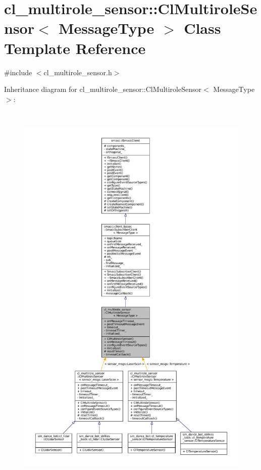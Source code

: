 \hypertarget{classcl__multirole__sensor_1_1ClMultiroleSensor}{}\section{cl\+\_\+multirole\+\_\+sensor\+:\+:Cl\+Multirole\+Sensor$<$ Message\+Type $>$ Class Template Reference}
\label{classcl__multirole__sensor_1_1ClMultiroleSensor}


{\ttfamily \#include $<$cl\+\_\+multirole\+\_\+sensor.\+h$>$}



Inheritance diagram for cl\+\_\+multirole\+\_\+sensor\+:\+:Cl\+Multirole\+Sensor$<$ Message\+Type $>$\+:
\nopagebreak
\begin{figure}[H]
\begin{center}
\leavevmode
\includegraphics[height=550pt]{classcl__multirole__sensor_1_1ClMultiroleSensor__inherit__graph}
\end{center}
\end{figure}


